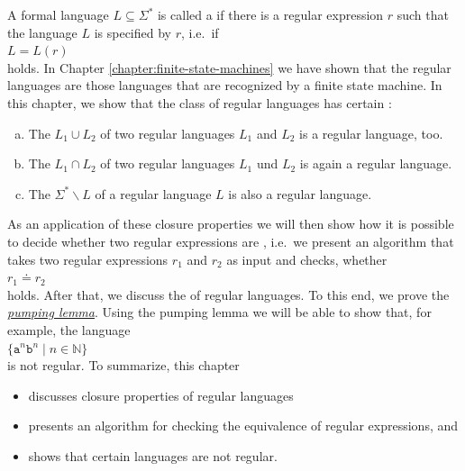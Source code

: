 A formal language $L \subseteq \Sigma^*$ is called a  
if there is a regular expression $r$ such that the language $L$ is specified by $r$, i.e.~if
\\[0.2cm]
\hspace*{1.3cm}
$L = L(r)$ 
\\[0.2cm]
holds.  In Chapter \ref{chapter:finite-state-machines} we have shown that the regular languages
are those languages that are recognized by a finite state machine.  In this chapter, we show
that the class of regular languages has certain :
\begin{enumerate}[(a)]
\item The  $L_1 \cup L_2$ of two regular languages $L_1$ and $L_2$ is a regular language, too.
\item The  $L_1 \cap L_2$ of two regular languages $L_1$ und $L_2$ is again a regular language.
\item The   $\Sigma^* \backslash L$ of a regular language $L$
      is also a regular language.
\end{enumerate}
As an application of these closure properties we will then show how it is possible to decide whether two
regular expressions are , i.e.~we present an algorithm that takes two regular expressions
$r_1$ and $r_2$ as input and checks, whether 
\\[0.2cm]
\hspace*{1.3cm}
$r_1 \doteq r_2$
\\[0.2cm]
holds.  After that, we discuss the  of regular languages.  To this end, we prove the
\href{http://en.wikipedia.org/wiki/Pumping_lemma_for_regular_languages}{\emph{pumping lemma}}.
Using the pumping lemma we will be able to show that, for example, the language
\\[0.2cm]
\hspace*{1.3cm} $\{ \mathtt{a}^n \mathtt{b}^n \mid n \in \mathbb{N} \}$
\\[0.2cm]
is not regular.  To summarize, this chapter 
\begin{itemize}
\item discusses closure properties of regular languages
\item presents an algorithm for checking the equivalence of regular expressions, and
\item shows that certain languages are not regular.
\end{itemize}


